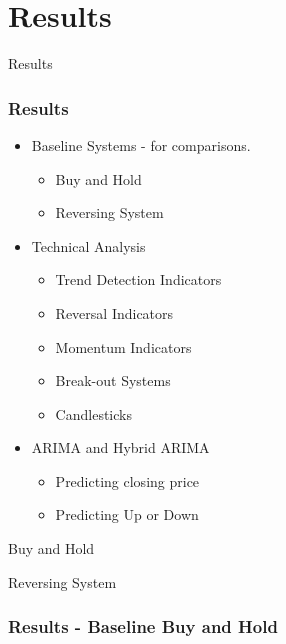 \documentclass{beamer}
\begin{document}
\section{Results} %

\begin{frame}
\Huge{\centerline{Results}}
\end{frame}

\begin{frame}
\frametitle{Results}

\begin{itemize}
\item Baseline Systems - for comparisons.
	\begin{itemize}
	\item Buy and Hold
	\item Reversing System
	\end{itemize}
\item Technical Analysis
	\begin{itemize}
	\item Trend Detection Indicators
	\item Reversal Indicators
	\item Momentum Indicators
	\item Break-out Systems
	\item Candlesticks
	\end{itemize}
\item ARIMA and Hybrid ARIMA
	\begin{itemize}
	\item Predicting closing price
	\item Predicting Up or Down
	\end{itemize}
\end{itemize}

\end{frame}

\begin{frame}
\Huge{\centerline{Buy and Hold}}
\Huge{\centerline{Reversing System}}
\end{frame}

\begin{frame}
\frametitle{Results - Baseline Buy and Hold}



\end{frame}
\end{document}
